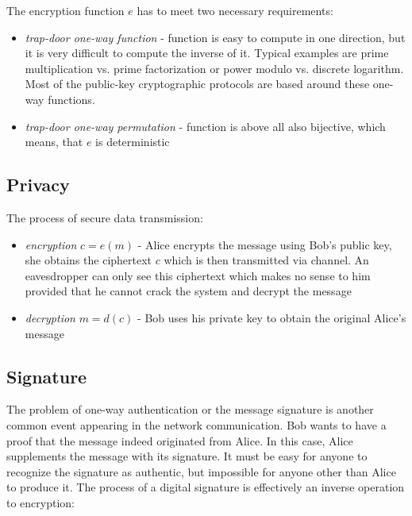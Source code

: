 \noindent
The encryption function $e$ has to meet two necessary requirements:

\begin{itemize}

\item \textit{trap-door one-way function} \cite{trapdoor} - function is easy to compute in one direction, but it is very difficult to compute the inverse of it. Typical examples are prime multiplication vs. prime factorization or power modulo vs. discrete logarithm. Most of the public-key cryptographic protocols are based around these one-way functions.

\item \textit{trap-door one-way permutation} - function is above all also bijective, which means, that $e$ is deterministic 

\end{itemize}

\subsection*{Privacy}

The process of secure data transmission:

\begin{itemize}

\item \textit{encryption} $c = e(m)$ - Alice encrypts the message using Bob's public key, she obtains the ciphertext $c$ which is then transmitted via channel. An eavesdropper can only see this ciphertext which makes no sense to him provided that he cannot crack the system and decrypt the message

\item \textit{decryption} $m = d(c)$ - Bob uses his private key to obtain the original Alice's message

\end{itemize}

\subsection*{Signature}

The problem of one-way authentication or the message signature is another common event appearing in the network communication. Bob wants to have a proof that the message indeed originated from Alice. In this case, Alice supplements the message with its signature. It must be easy for anyone to recognize the signature as authentic, but impossible for anyone other than Alice to produce it. The process of a digital signature is effectively an inverse operation to encryption:

